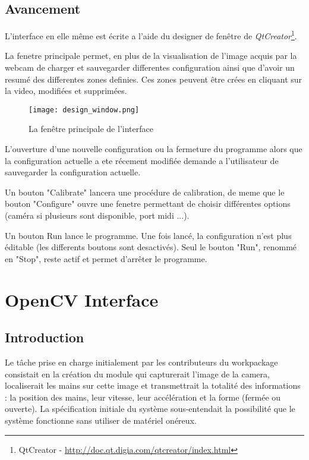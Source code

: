 \subsection{Avancement}
\par L'interface en elle même est écrite a l'aide du designer de fenêtre de \emph{QtCreator}\footnote{QtCreator - \url{http://doc.qt.digia.com/qtcreator/index.html}}.
\par La fenetre principale permet, en plus de la visualisation de l'image acquis par la webcam de charger et sauvegarder differentes configuration ainsi que d'avoir un resumé des differentes zones definies. Ces zones peuvent être crées en cliquant sur la video, modifiées et supprimées.
\begin{figure}
    \centering
    \texttt{[image: design\_window.png]}
    \caption{La fenêtre principale de l'interface}
\end{figure}
\par L'ouverture d'une nouvelle configuration ou la fermeture du programme alors que la configuration actuelle a ete récement modifiée demande a l'utilisateur de sauvegarder la configuration actuelle.
\par Un bouton "Calibrate" lancera une procédure de calibration, de meme que le bouton "Configure" ouvre une fenetre permettant de choisir différentes options (caméra si plusieurs sont disponible, port midi ...).
\par Un bouton Run lance le programme. Une fois lancé, la configuration n'est plus éditable (les differents boutons sont desactivés). Seul le bouton "Run", renommé en "Stop", reste actif et permet d'arrêter le programme.

\section{OpenCV Interface}
\subsection{Introduction}
\par Le tâche prise en charge initialement par les contributeurs du workpackage consistait en la création du module qui capturerait l'image de la camera, localiserait les mains sur cette image et transmettrait la totalité des informations : la position des mains, leur vitesse, leur accélération et la forme (fermée ou ouverte). La spécification initiale du système sous-entendait la possibilité que le système fonctionne sans utiliser de matériel onéreux.
